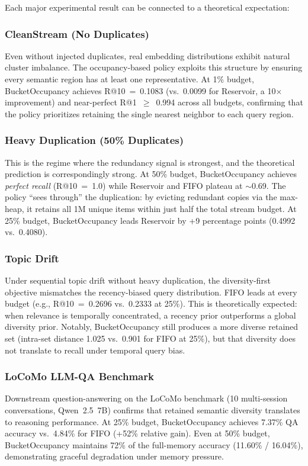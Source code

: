 \documentclass[conference]{IEEEtran}
\begin{document}
Each major experimental result can be connected to a theoretical
expectation:

\subsubsection{CleanStream (No Duplicates)}
Even without injected duplicates, real embedding distributions exhibit
natural cluster imbalance. The occupancy-based policy exploits this
structure by ensuring every semantic region has at least one
representative. At 1\% budget, BucketOccupancy achieves R@10~=~0.1083
(vs.\ 0.0099 for Reservoir, a 10$\times$ improvement) and near-perfect
R@1~$\ge$~0.994 across all budgets, confirming that the policy
prioritizes retaining the single nearest neighbor to each query region.

\subsubsection{Heavy Duplication (50\% Duplicates)}
This is the regime where the redundancy signal is strongest, and the
theoretical prediction is correspondingly strong. At 50\% budget,
BucketOccupancy achieves \emph{perfect recall} (R@10~=~1.0) while
Reservoir and FIFO plateau at $\sim$0.69. The policy ``sees through''
the duplication: by evicting redundant copies via the max-heap, it
retains all 1M unique items within just half the total stream budget.
At 25\% budget, BucketOccupancy leads Reservoir by +9 percentage points
(0.4992 vs.\ 0.4080).

\subsubsection{Topic Drift}
Under sequential topic drift without heavy duplication, the
diversity-first objective mismatches the recency-biased query
distribution. FIFO leads at every budget (e.g., R@10~=~0.2696 vs.\
0.2333 at 25\%). This is theoretically expected: when relevance is
temporally concentrated, a recency prior outperforms a global diversity
prior. Notably, BucketOccupancy still produces a more diverse retained
set (intra-set distance 1.025 vs.\ 0.901 for FIFO at 25\%), but that
diversity does not translate to recall under temporal query bias.

\subsubsection{LoCoMo LLM-QA Benchmark}
Downstream question-answering on the LoCoMo benchmark (10 multi-session
conversations, Qwen~2.5~7B) confirms that retained semantic diversity
translates to reasoning performance. At 25\% budget, BucketOccupancy
achieves 7.37\% QA accuracy vs.\ 4.84\% for FIFO (+52\% relative
gain). Even at 50\% budget, BucketOccupancy maintains 72\% of the
full-memory accuracy (11.60\% / 16.04\%), demonstrating graceful
degradation under memory pressure.
\end{document}

